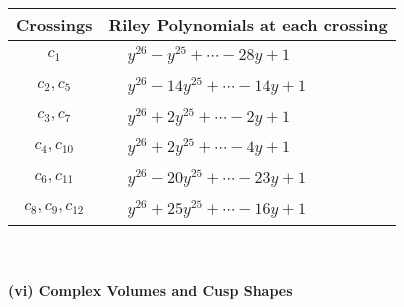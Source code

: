 \documentclass[1p]{elsarticle_modified}
\theoremstyle{definition}
\begin{document}
\begin{tabular}{m{50pt}|m{274pt}}
Crossings & \hspace{64pt}Riley Polynomials at each crossing \\
\hline $$\begin{aligned}c_{1}\end{aligned}$$&$\begin{aligned}
&y^{26}- y^{25}+\cdots-28 y+1
\end{aligned}$\\
\hline $$\begin{aligned}c_{2},c_{5}\end{aligned}$$&$\begin{aligned}
&y^{26}-14 y^{25}+\cdots-14 y+1
\end{aligned}$\\
\hline $$\begin{aligned}c_{3},c_{7}\end{aligned}$$&$\begin{aligned}
&y^{26}+2 y^{25}+\cdots-2 y+1
\end{aligned}$\\
\hline $$\begin{aligned}c_{4},c_{10}\end{aligned}$$&$\begin{aligned}
&y^{26}+2 y^{25}+\cdots-4 y+1
\end{aligned}$\\
\hline $$\begin{aligned}c_{6},c_{11}\end{aligned}$$&$\begin{aligned}
&y^{26}-20 y^{25}+\cdots-23 y+1
\end{aligned}$\\
\hline $$\begin{aligned}c_{8},c_{9},c_{12}\end{aligned}$$&$\begin{aligned}
&y^{26}+25 y^{25}+\cdots-16 y+1
\end{aligned}$\\
\hline
\end{tabular}\\~\\
\newpage\flushleft \textbf{(vi) Complex Volumes and Cusp Shapes}
\end{document}
